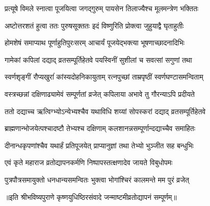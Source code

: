\twolineshloka
{प्रत्यूषे विमले स्नात्वा पूजयित्वा जगद्गुरुम्}
{पायसेन तिलाज्यैश्च मूलमन्त्रेण भक्तितः}

\twolineshloka
{अष्टोत्तरशतं हुत्वा ततः पुरुषसूक्ततः}
{इदं विष्णुरिति प्रोक्त्वा जुहुयाद्वै घृताहुतीः}

\twolineshloka
{होमशेषं समाप्याथ पूर्णाहुतिपुरःसरम्}
{आचार्यं पूजयेद्भक्त्या भूषणाच्छादनादिभिः}

\twolineshloka
{गामेकां कपिलां दद्याद् व्रतसम्पूर्तिहेतवे}
{पयस्विनीं सुशीलां च सवत्सां सगुणां तथा}

\twolineshloka
{स्वर्णशृङ्गीं रौप्यखुरांं कांस्यदोहनिकायुताम्}
{रत्नपुच्छां ताम्रपृष्ठीं स्वर्णघण्टासमन्विताम्}

\twolineshloka
{वस्त्रच्छन्नां दक्षिणाढ्यामेवं सम्पूर्णतां व्रजेत्}
{कपिलाया अभावे तु गौरन्याऽपि प्रदीयते}

\twolineshloka
{ततो दद्याच्च ऋत्विग्भ्योऽन्येभ्यश्चैव यथाविधि}
{शय्यां सोपस्करां दद्याद् व्रतसम्पूर्तिहेतवे}

\twolineshloka
{ब्राह्मणान्भोजयेत्पश्चादष्टौ तेभ्यश्च दक्षिणाम्}
{कलशानन्नसम्पूर्णान्दद्याच्चैव समाहितः}

\twolineshloka
{दीनान्धकृपणांश्चैव यथार्हं प्रतिपूजयेत्}
{प्राप्यानुज्ञां तथा तेभ्यो भुञ्जीत सह बन्धुभिः}

\twolineshloka
{एवं कृते महाराज व्रतोद्यापनकर्मणि}
{निष्पापस्तत्क्षणादेव जायते विबुधोपमः}

\twolineshloka
{पुत्रपौत्रसमायुक्तो धनधान्यसमन्वितः}
{भुक्त्वा भोगांश्चिरं कालमन्ते मम पुरं व्रजेत्}

॥इति श्रीभविष्यपुराणे कृष्णयुधिष्ठिरसंवादे जन्माष्टमीव्रतोद्यापनं सम्पूर्णम्॥

\endgroup